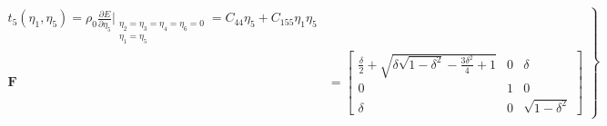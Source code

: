 \documentclass[showpacs,aps,floatfix,prb,reprint,superscriptaddress,onecolumn]{revtex4-1}
\begin{document}

\begin{equation}
\label{eqn:SM-s12}
  \left.\begin{aligned}
        t_{5} \left(\eta_{1}, \eta_{5}\right) = \rho_{0} \frac{\partial E}{\partial \eta_{5}}\Bigr|_{\substack{\eta_2=\eta_3=\eta_4=\eta_6=0 \\ \eta_{1}=\eta_{5}}} = C_{44}\eta_{5} + C_{155}\eta_{1}\eta_{5}\\
        \bm{F}&=\begin{bmatrix} \frac{\delta}{2}+\sqrt{\delta \sqrt{1-\delta^2}-\frac{3 \delta^2}{4}+1} & 0 & \delta \\ 0 & 1 & 0 \\ \delta & 0 & \sqrt{1-\delta^2} 
				\end{bmatrix}
       \end{aligned}
			\right\}
\end{equation}












\end{document}
